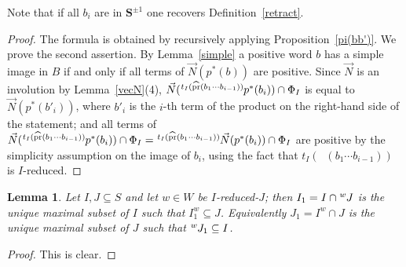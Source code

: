\documentclass{amsart}
\numberwithin{equation}{section}
\newtheorem{lemma}[equation]{Lemma}
\newcommand\vN{\vec N}
\newcommand\lexp[2]{\kern\scriptspace\vphantom{#2}^{#1}\kern-\scriptspace#2}
\newcommand\bS{{\mathbf S}}
\DeclareMathOperator\hpr{\widehat{pr}}
\begin{document}
Note that if all $b_i$ are in $\bS^{\pm1}$ one recovers Definition~\ref{retract}.
\begin{proof}
The formula is obtained by recursively applying Proposition~\ref{pi(bb')}.
We prove the second assertion. By Lemma~\ref{simple} 
a positive word $b$ has a simple image in $B$ if
and only if all terms of $\vN(p^*(b))$ are positive. Since $\vN$ is an
involution by Lemma~\ref{vecN}(4), 
$\vN(\lexp{t_I(\hpr(b_1\cdots b_{i-1}))}p^*(b_i))\cap\Phi_I$ is
equal to $\vN(p^*(b'_i))$, where $b'_i$ is the $i$-th term of the product on the
right-hand side of the statement; 
and all terms of $\vN(\lexp{t_I(\hpr(b_1\cdots b_{i-1}))}p^*(b_i))\cap\Phi_I=
\lexp{t_I(\hpr(b_1\cdots b_{i-1}))}\vN(p^*(b_i))\cap\Phi_I$ are positive by the
simplicity assumption on the image of $b_i$, using the fact that $t_I(\hpr(b_1\cdots b_{i-1}))$
is $I$-reduced.
\end{proof}

\begin{lemma} \label{IredJ} Let $I,J\subseteq S$ and let $w\in W$ be $I$-reduced-$J$;
then $I_1=I\cap\lexp w J$ is the unique maximal subset of $I$ such that
$I_1^w\subseteq J$. Equivalently $J_1= I^w\cap J$ is the unique maximal subset
of $J$ such that $\lexp w J_1\subseteq I$.
\end{lemma}
\begin{proof} This is clear.
\end{proof}
\end{document}

